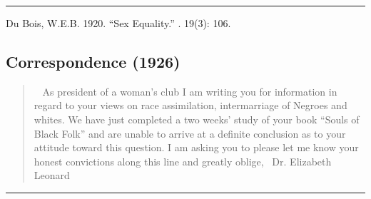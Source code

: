 \documentclass[letterpaper,10pt,english]{jupyterBook}
\begin{document}
\bigskip\hrule\bigskip


\sphinxAtStartPar
{} Du Bois, W.E.B. 1920. “Sex Equality.” . 19(3): 106.


\subsection{Correspondence (1926)}
\label{\detokenize{Volumes/31/05/correspondence:correspondence-1926}}\label{\detokenize{Volumes/31/05/correspondence::doc}}\begin{quote}

\sphinxAtStartPar
{} 
As president of a woman’s club I am writing you for information in regard to your views on race assimilation, intermarriage of Negroes and whites. We have just completed a two weeks’ study of your book “Souls of Black Folk” and are unable to arrive at a definite conclusion as to your attitude toward this question. I am asking you to please let me know your honest convictions along this line and greatly oblige, 
Dr. Elizabeth Leonard
\end{quote}


\bigskip\hrule\bigskip
\end{document}
